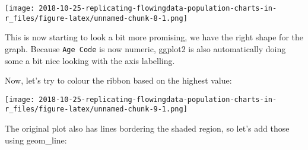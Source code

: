 \documentclass[]{article}
\newenvironment{Shaded}{\begin{snugshade}}{\end{snugshade}}
\newcommand{\KeywordTok}[1]{\textcolor[rgb]{0.13,0.29,0.53}{\textbf{#1}}}
\newcommand{\DataTypeTok}[1]{\textcolor[rgb]{0.13,0.29,0.53}{#1}}
\newcommand{\DecValTok}[1]{\textcolor[rgb]{0.00,0.00,0.81}{#1}}
\newcommand{\StringTok}[1]{\textcolor[rgb]{0.31,0.60,0.02}{#1}}
\newcommand{\OperatorTok}[1]{\textcolor[rgb]{0.81,0.36,0.00}{\textbf{#1}}}
\newcommand{\NormalTok}[1]{#1}
\begin{document}
\texttt{[image: 2018-10-25-replicating-flowingdata-population-charts-in-r\_files/figure-latex/unnamed-chunk-8-1.png]}

This is now starting to look a bit more promising, we have the right
shape for the graph. Because \texttt{Age\ Code} is now numeric, ggplot2
is also automatically doing some a bit nice looking with the axis
labelling.

Now, let's try to colour the ribbon based on the highest value:

\begin{Shaded}
\end{Shaded}

\texttt{[image: 2018-10-25-replicating-flowingdata-population-charts-in-r\_files/figure-latex/unnamed-chunk-9-1.png]}

The original plot also has lines bordering the shaded region, so let's
add those using geom\_line:

\begin{Shaded}
\end{Shaded}
\end{document}
